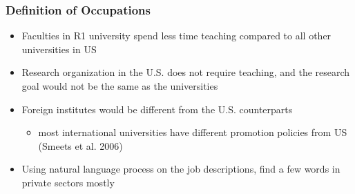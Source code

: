 \documentclass[11pt]{beamer}
\begin{document}
\begin{frame}[label=Occupation]
	\frametitle{Definition of Occupations}
	\begin{itemize}
	
			\item Faculties in R1 university spend less time teaching compared to all other universities in US%
			
			\item Research organization in the U.S. does not require teaching, and the research goal would not be the same as the universities
			\vspace{1.5 mm}
			\item Foreign institutes would be different from the U.S. counterparts
			\begin{itemize}
				\item most international universities have different promotion policies from  US (Smeets et al. 2006)
			\end{itemize}
		\vspace{1.5 mm}
			\item Using natural language process on the job descriptions, find a few words in private sectors mostly  \hyperlink{NLP}{}
		\end{itemize}

\end{frame}
\end{document}
